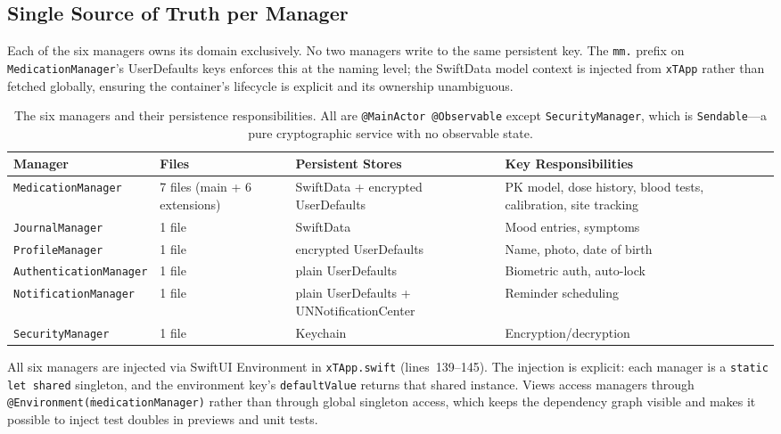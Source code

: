 \documentclass[11pt,a4paper]{article}
\newcommand{\code}[1]{\texttt{\small #1}}
\begin{document}
\subsection{Single Source of Truth per Manager}
\label{sec:single_source}

Each of the six managers owns its domain exclusively. No two managers write
to the same persistent key. The \code{mm.} prefix on
\code{MedicationManager}'s UserDefaults keys enforces this at the naming
level; the SwiftData model context is injected from \code{xTApp} rather than
fetched globally, ensuring the container's lifecycle is explicit and its
ownership unambiguous.

\begin{table}[h]
\centering
\small
\begin{tabular}{@{}p{2.8cm}p{3.2cm}p{3.0cm}p{5.5cm}@{}}
\toprule
\textbf{Manager} & \textbf{Files} & \textbf{Persistent Stores} &
\textbf{Key Responsibilities} \\
\midrule
\code{MedicationManager} & 7 files (main + 6 extensions) &
  SwiftData + encrypted UserDefaults &
  PK model, dose history, blood tests, calibration, site tracking \\
\midrule
\code{JournalManager} & 1 file & SwiftData &
  Mood entries, symptoms \\
\midrule
\code{ProfileManager} & 1 file & encrypted UserDefaults &
  Name, photo, date of birth \\
\midrule
\code{AuthenticationManager} & 1 file & plain UserDefaults &
  Biometric auth, auto-lock \\
\midrule
\code{NotificationManager} & 1 file & plain UserDefaults +
  UNNotificationCenter &
  Reminder scheduling \\
\midrule
\code{SecurityManager} & 1 file & Keychain &
  Encryption/decryption \\
\bottomrule
\end{tabular}
\caption{The six managers and their persistence responsibilities. All are
\code{@MainActor @Observable} except \code{SecurityManager}, which is
\code{Sendable}---a pure cryptographic service with no observable state.}
\label{tab:managers}
\end{table}

All six managers are injected via SwiftUI Environment in \code{xTApp.swift}
(lines~139--145). The injection is explicit: each manager is a
\code{static let shared} singleton, and the environment key's
\code{defaultValue} returns that shared instance. Views access managers
through \code{@Environment(\.medicationManager)} rather than through global
singleton access, which keeps the dependency graph visible and makes it
possible to inject test doubles in previews and unit tests.
\end{document}
